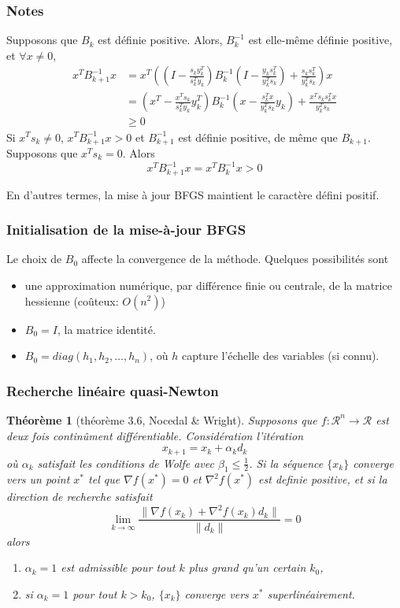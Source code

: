 \documentclass[usepdftitle=false]{beamer}
\newtheorem{thm}{Théorème}
\def\cR{\mathcal{R}}
\begin{document}
\begin{frame}
\frametitle{Notes}

Supposons que $B_k$ est définie positive. Alors, $B_k^{-1}$ est elle-même définie positive, et $\forall x \ne 0$,
\begin{align*}
x^T B_{k+1}^{-1} x &=
x^T \left(
\left( I - \frac{s_k y_k^T}{s_k^T y_k} \right) B_k^{-1}  \left( I - \frac{y_k s_k^T}{y_k^T s_k} \right) + \frac{s_k s_k^T}{y_k^T s_k}
\right) x \\
&=
\left( x^T - \frac{x^Ts_k}{s_k^T y_k} y_k^T \right) B_k^{-1}  \left( x - \frac{s_k^Tx}{y_k^T s_k}y_k  \right) + \frac{x^Ts_k s_k^Tx}{y_k^T s_k} \\
& \geq 0
\end{align*}
Si $x^Ts_k \ne 0$, $x^T B_{k+1}^{-1} x > 0$ et $B_{k+1}^{-1}$ est définie positive, de même que $B_{k+1}$.
Supposons que $x^Ts_k = 0$. Alors
$$
x^T B_{k+1}^{-1} x = x^T B_k^{-1}x > 0
$$

\mbox{}

En d'autres termes, la mise à jour BFGS maintient le caractère défini positif.
	
\end{frame}

\begin{frame}
\frametitle{Initialisation de la mise-à-jour BFGS}

Le choix de $B_0$ affecte la convergence de la méthode.
Quelques possibilités sont
\begin{itemize}
\item
une approximation numérique, par différence finie ou centrale, de la matrice hessienne (coûteux: $O(n^2)$)
\item
$B_0 = I$, la matrice identité.
\item
$B_0 = diag(h_1,h_2,\ldots,h_n)$, où $h$ capture l'échelle des variables (si connu).
\end{itemize}

\end{frame}

\begin{frame}
\frametitle{Recherche linéaire quasi-Newton}

\begin{thm}[théorème 3.6, Nocedal \& Wright]
Supposons que $f: \cR^n \rightarrow \cR$ est deux fois continûment différentiable.
Considération l'itération
$$
x_{k+1} = x_k + \alpha_k d_k
$$
où $\alpha_k$ satisfait les conditions de Wolfe avec $\beta_1 \leq \frac{1}{2}$.
Si la séquence $\{ x_k \}$ converge vers un point $x^*$ tel que $\nabla f(x^*) = 0$ et $\nabla^2 f(x^*)$
est definie positive, et si la direction de recherche satisfait
$$
\lim_{k \rightarrow \infty} \frac{\|\nabla f(x_k) + \nabla^2 f(x_k) d_k \|}{\|d_k\|} = 0
$$
alors
\begin{enumerate}
\item 
$\alpha_k = 1$ est admissible pour tout $k$ plus grand qu'un certain $k_0$,
\item
si $\alpha_k = 1$ pour tout $k > k_0$, $\{ x_k \}$ converge vers $x^*$ superlinéairement.
\end{enumerate}
\end{thm}

\end{frame}
\end{document}
